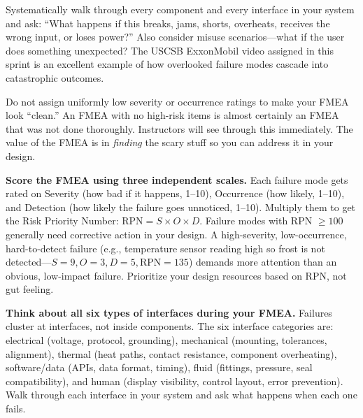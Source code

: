 \begin{faqbox}
Systematically walk through every component and every interface in your system and ask: ``What happens if this breaks, jams, shorts, overheats, receives the wrong input, or loses power?'' Also consider misuse scenarios---what if the user does something unexpected? The USCSB ExxonMobil video assigned in this sprint is an excellent example of how overlooked failure modes cascade into catastrophic outcomes.
\end{faqbox}

\begin{warnbox}
Do not assign uniformly low severity or occurrence ratings to make your FMEA look ``clean.'' An FMEA with no high-risk items is almost certainly an FMEA that was not done thoroughly. Instructors will see through this immediately. The value of the FMEA is in \textit{finding} the scary stuff so you can address it in your design.
\end{warnbox}

\begin{tipbox}
\textbf{Score the FMEA using three independent scales.} Each failure mode gets rated on Severity (how bad if it happens, 1--10), Occurrence (how likely, 1--10), and Detection (how likely the failure goes unnoticed, 1--10). Multiply them to get the Risk Priority Number: $\text{RPN} = S \times O \times D$. Failure modes with RPN $\geq 100$ generally need corrective action in your design. A high-severity, low-occurrence, hard-to-detect failure (e.g., temperature sensor reading high so frost is not detected---$S=9, O=3, D=5, \text{RPN}=135$) demands more attention than an obvious, low-impact failure. Prioritize your design resources based on RPN, not gut feeling.
\end{tipbox}

\begin{protip}
\textbf{Think about all six types of interfaces during your FMEA.} Failures cluster at interfaces, not inside components. The six interface categories are: electrical (voltage, protocol, grounding), mechanical (mounting, tolerances, alignment), thermal (heat paths, contact resistance, component overheating), software/data (APIs, data format, timing), fluid (fittings, pressure, seal compatibility), and human (display visibility, control layout, error prevention). Walk through each interface in your system and ask what happens when each one fails.
\end{protip}

